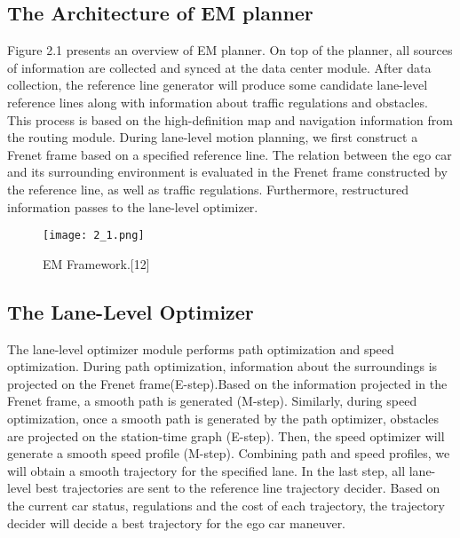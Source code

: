\documentclass{report}
\begin{document}
 \subsection{The Architecture of EM planner}
 Figure 2.1 presents an overview of EM planner. On top of the planner, all sources of information are collected and synced at the data center module. After data collection, the reference line generator will produce some candidate lane-level reference lines along with information about traffic regulations and obstacles. This process is based on the high-definition map and navigation information from the routing module. During lane-level motion planning, we first construct a Frenet frame based on a specified reference line. The relation between the ego car and its surrounding environment is evaluated in the Frenet frame constructed by the reference line, as well as traffic regulations. Furthermore, restructured information passes to the lane-level optimizer.
    \begin{figure}[ht]
 	\centering
 	\texttt{[image: 2\_1.png]}
 	\caption{EM Framework.[12]}
 	\label{fig:2.1} 
 \end{figure}

\subsection{The Lane-Level Optimizer}
The lane-level optimizer module performs path optimization and speed optimization. During path optimization, information about the surroundings is projected on the Frenet frame(E-step).Based on the information projected in the Frenet frame, a smooth path is generated (M-step). Similarly, during speed optimization, once a smooth path is generated by the path optimizer, obstacles are projected on the station-time graph (E-step). Then, the speed optimizer will generate a smooth speed profile (M-step). Combining path and speed profiles, we will obtain a smooth trajectory for the specified lane. In the last step, all lane-level best trajectories are sent to the reference line trajectory decider. Based on the current car status, regulations and the cost of each trajectory, the trajectory decider will decide a best trajectory for the ego car maneuver.
 
 
\end{document}

